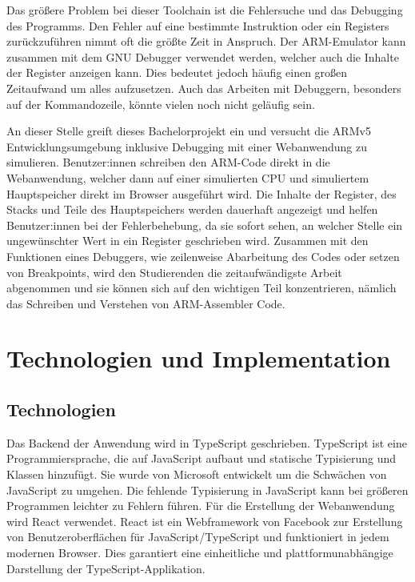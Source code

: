 \documentclass[a4paper, 11pt, onecolumn]{article}
\begin{document}
Das größere Problem bei dieser Toolchain ist die Fehlersuche und das Debugging des Programms. Den Fehler auf eine bestimmte Instruktion oder ein Registers zurückzuführen nimmt oft die größte Zeit in Anspruch. Der ARM-Emulator kann zusammen mit dem GNU Debugger \cite{gdb}  verwendet werden, welcher auch die Inhalte der Register anzeigen kann. Dies bedeutet jedoch häufig einen großen Zeitaufwand um alles aufzusetzen. Auch das Arbeiten mit Debuggern, besonders auf der Kommandozeile, könnte vielen noch nicht geläufig sein. 

An dieser Stelle greift dieses Bachelorprojekt ein und versucht die ARMv5 Entwicklungsumgebung inklusive Debugging mit einer Webanwendung zu simulieren. Benutzer:innen schreiben den ARM-Code direkt in die Webanwendung, welcher dann auf einer simulierten CPU und simuliertem Hauptspeicher direkt im Browser ausgeführt wird. Die Inhalte der Register, des Stacks und Teile des Hauptspeichers werden dauerhaft angezeigt und helfen Benutzer:innen bei der Fehlerbehebung, da sie sofort sehen, an welcher Stelle ein ungewünschter Wert in ein Register geschrieben wird. Zusammen mit den Funktionen eines Debuggers, wie zeilenweise Abarbeitung des Codes oder setzen von Breakpoints, wird den Studierenden die zeitaufwändigste Arbeit abgenommen und sie können sich auf den wichtigen Teil konzentrieren, nämlich das Schreiben und Verstehen von ARM-Assembler Code.

\section{Technologien und Implementation}

\subsection{Technologien}

Das Backend der Anwendung wird in TypeScript geschrieben. TypeScript \cite{understandingtypescript}\cite{typescript} ist eine Programmiersprache, die auf JavaScript aufbaut und statische Typisierung und Klassen hinzufügt. Sie wurde von Microsoft entwickelt um die Schwächen von JavaScript zu umgehen. Die fehlende Typisierung in JavaScript kann bei größeren Programmen leichter zu Fehlern führen. Für die Erstellung der Webanwendung wird React verwendet. React \cite{react} ist ein Webframework von Facebook zur Erstellung von Benutzeroberflächen für JavaScript/TypeScript und funktioniert in jedem modernen Browser. Dies garantiert eine einheitliche und plattformunabhängige Darstellung der TypeScript-Applikation.
\end{document}
